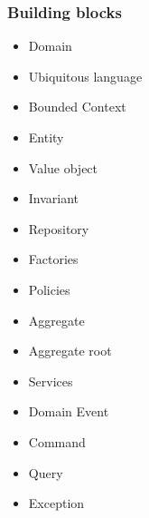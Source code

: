 \documentclass{beamer}
\begin{document}

\begin{frame}
\frametitle{\textbf{Building blocks}}

\begin{minipage}{0.4\textwidth}
\begin{center}
    \begin{itemize}
        \item Domain
        \item Ubiquitous language
        \item Bounded Context
        \item Entity
        \item Value object
        \item Invariant
        \item Repository
    \end{itemize}	
\end{center}
\end{minipage}
\hspace{5mm}
\begin{minipage}{0.4\textwidth}
    \begin{itemize}
        \item Factories
        \item Policies
        \item Aggregate
        \item Aggregate root
        \item Services
        \item Domain Event
        \item Command
        \item Query
        \item Exception
    \end{itemize}	
\end{minipage}

\end{frame}

\end{document}
